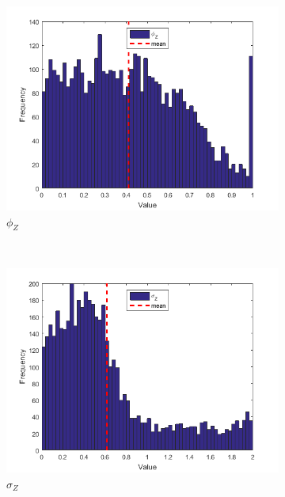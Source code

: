 \documentclass[11pt,a4,twosided,singlespacing,titlepagenumber=on]{scrreprt}
\numberwithin{equation}{chapter} %
\theoremstyle{remark}
\begin{document}
\begin{figure}[H]
\begin{subfigure}[t]{0.32\textwidth}
        \includegraphics[width=1\textwidth]{res/params/2192_2923/3}
        \caption{$\phi_Z$}
    \end{subfigure} \\
    \begin{subfigure}[t]{0.32\textwidth}
        \centering
        \includegraphics[width=1\textwidth]{res/params/2192_2923/4}
        \caption{$\sigma_Z$}
    \end{subfigure}
    \begin{subfigure}[t]{0.32\textwidth}
        \centering

\end{subfigure}
\end{figure}
\end{document}

